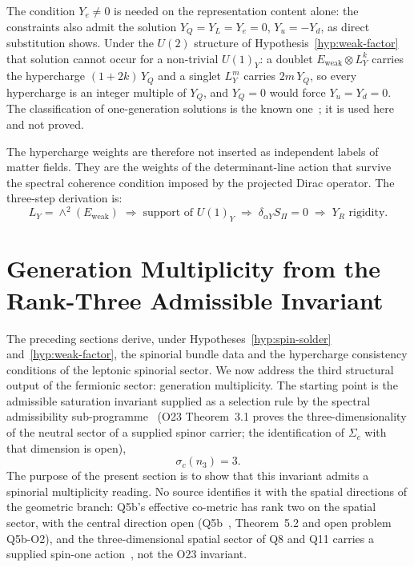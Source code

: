 \documentclass[11pt,a4paper]{article}
\theoremstyle{definition}
\theoremstyle{remark}
\begin{document}
    The condition $Y_e \neq 0$ is needed on the representation content alone: the constraints also admit
    the solution $Y_Q = Y_L = Y_e = 0$, $Y_u = -Y_d$, as direct substitution shows.
    Under the $U(2)$ structure of Hypothesis~\ref{hyp:weak-factor} that solution cannot occur for a
    non-trivial $U(1)_Y$: a doublet $E_{\mathrm{weak}} \otimes L_Y^{k}$ carries the hypercharge
    $(1 + 2k)\,Y_Q$ and a singlet $L_Y^{m}$ carries $2m\,Y_Q$, so every hypercharge is an integer multiple
    of $Y_Q$, and $Y_Q = 0$ would force $Y_u = Y_d = 0$.
    The classification of one-generation solutions is the known one~\cite{GengMarshak1989,MinahanRamondWarner1990};
    it is used here and not proved.

    The hypercharge weights are therefore not inserted as independent labels of matter
    fields.
    They are the weights of the determinant-line action that survive the spectral
    coherence condition imposed by the projected Dirac operator.
    The three-step derivation is:
    \begin{equation}
      \label{eq:hypercharge-chain}
      L_Y = \wedge^2(E_{\mathrm{weak}})
      \;\Rightarrow\;
      \text{support of } U(1)_Y
      \;\Rightarrow\;
      \delta_{\alpha Y} S_\Pi = 0
      \;\Rightarrow\;
      Y_R \text{ rigidity}.
    \end{equation}

  \section{Generation Multiplicity from the Rank-Three Admissible Invariant}
  \label{sec:generations}

  The preceding sections derive, under Hypotheses~\ref{hyp:spin-solder} and~\ref{hyp:weak-factor}, the
  spinorial bundle data and the hypercharge consistency conditions of the leptonic spinorial sector.
  We now address the third structural output of the fermionic sector: generation
  multiplicity.
  The starting point is the admissible saturation invariant supplied as a selection rule
  by the spectral admissibility sub-programme~\cite{Beau2026a27} (O23 Theorem~3.1 proves
  the three-dimensionality of the neutral sector of a supplied spinor carrier; the
  identification of $\Sigma_c$ with that dimension is open),
  \begin{equation}
    \label{eq:sigma-n3}
    \sigma_c(n_3) = 3 .
  \end{equation}
  The purpose of the present section is to show that this invariant admits a spinorial
  multiplicity reading.
  No source identifies it with the spatial directions of the geometric branch: Q5b's effective
  co-metric has rank two on the spatial sector, with the central direction open
  (Q5b~\cite{Beau2026q5b}, Theorem~5.2 and open problem Q5b-O2), and the three-dimensional spatial
  sector of Q8 and Q11 carries a supplied spin-one action~\cite{BeauQ8,Beau2026q11}, not the O23
  invariant.
\end{document}
